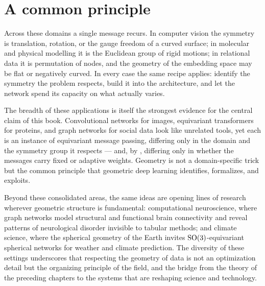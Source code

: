 \section{A common principle}
\label{sec:apps:common}

Across these domains a single message recurs. In computer vision the symmetry is
translation, rotation, or the gauge freedom of a curved surface; in molecular
and physical modelling it is the Euclidean group of rigid motions; in relational
data it is permutation of nodes, and the geometry of the embedding space may be
flat or negatively curved. In every case the same recipe applies: identify the
symmetry the problem respects, build it into the architecture, and let the
network spend its capacity on what actually varies.

\begin{remark}
\label{rem:apps:unification}
The breadth of these applications is itself the strongest evidence for the
central claim of this book. Convolutional networks for images, equivariant
transformers for proteins, and graph networks for social data look like
unrelated tools, yet each is an instance of equivariant message passing,
differing only in the domain and the symmetry group it respects --- and, by
, differing only in whether the messages
carry fixed or adaptive weights. Geometry is not a domain-specific trick but the
common principle that geometric deep learning identifies, formalizes, and
exploits.
\end{remark}

Beyond these consolidated areas, the same ideas are opening lines of research
wherever geometric structure is fundamental: computational neuroscience, where
graph networks model structural and functional brain connectivity and reveal
patterns of neurological disorder invisible to tabular methods; and climate
science, where the spherical geometry of the Earth invites $\mathrm{SO}(3)$-equivariant
spherical networks for weather and climate prediction. The diversity of these
settings underscores that respecting the geometry of data is not an
optimization detail but the organizing principle of the field, and the bridge
from the theory of the preceding chapters to the systems that are reshaping
science and technology.
